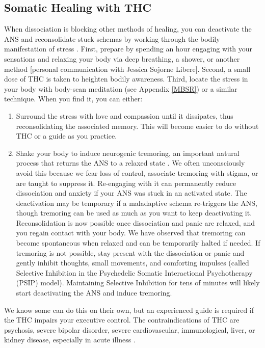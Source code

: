 \documentclass[12pt,letterpaper]{article}
\begin{document}
\subsection{Somatic Healing with THC}
\label{psip}
When dissociation is blocking other methods of healing, you can deactivate the ANS and reconsolidate stuck schemas by working through the bodily manifestation of stress \cite{razviPSIP}. First, prepare by spending an hour engaging with your sensations and relaxing your body via deep breathing, a shower, or another method [personal communication with Jessica Sojorne Libere]. Second, a small dose of THC is taken to heighten bodily awareness. Third, locate the stress in your body with body-scan meditation (see Appendix \ref{MBSR}) or a similar technique. When you find it, you can either:
\begin{enumerate}
    \item Surround the stress with love and compassion until it dissipates, thus reconsolidating the associated memory. This will become easier to do without THC or a guide as you practice.
    \item Shake your body to induce neurogenic tremoring, an important natural process that returns the ANS to a relaxed state \cite{berceliTremor,razviPSIP}. We often unconsciously avoid this because we fear loss of control, associate tremoring with stigma, or are taught to suppress it. Re-engaging with it can permanently reduce dissociation and anxiety if your ANS was stuck in an activated state. The deactivation may be temporary if a maladaptive schema re-triggers the ANS, though tremoring can be used as much as you want to keep deactivating it. Reconsolidation is now possible once dissociation and panic are relaxed, and you regain contact with your body. We have observed that tremoring can become spontaneous when relaxed and can be temporarily halted if needed. If tremoring is not possible, stay present with the dissociation or panic and gently inhibit thoughts, small movements, and comforting impulses (called Selective Inhibition in the Psychedelic Somatic Interactional Psychotherapy (PSIP) model). Maintaining Selective Inhibition for tens of minutes will likely start deactivating the ANS and induce tremoring.
\end{enumerate}
We know some can do this on their own, but an experienced guide is required if the THC impairs your executive control. The contraindications of THC are psychosis, severe bipolar disorder, severe cardiovascular, immunological, liver, or kidney disease, especially in acute illness \cite{DCCannabis}.
\end{document}
